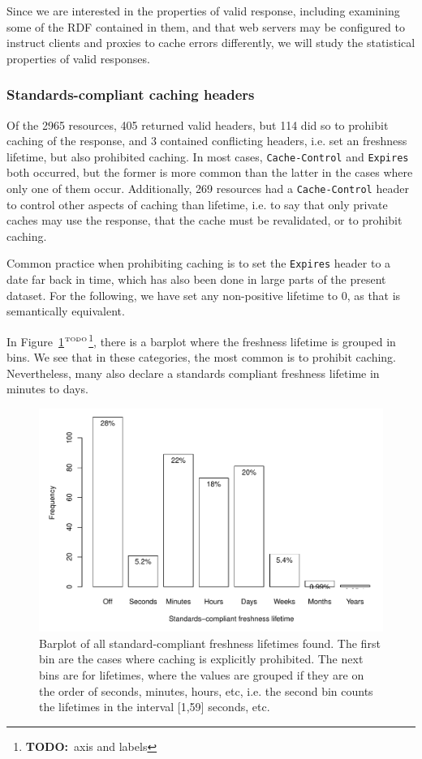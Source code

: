 \documentclass{llncs}
\newcommand{\httph}[1]{\texttt{#1}}
\newcommand{\todo}[1]{\ensuremath{^{\textrm{\tiny{TODO}\normalsize}}}\footnote{\textbf{TODO:}~#1}}
\begin{document}
Since we are interested in the properties of valid response, including
examining some of the RDF contained in them, and that web servers may
be configured to instruct clients and proxies to cache errors
differently, we will study the statistical properties of valid
responses.

\subsubsection{Standards-compliant caching headers}

Of the 2965 resources, 405 returned valid headers, but 114 did so to
prohibit caching of the response, and 3 contained conflicting
headers, i.e. set an freshness lifetime, but also prohibited
caching. In most cases, \httph{Cache-Control} and \httph{Expires} both
occurred, but the former is more common than the latter in the cases
where only one of them occur.  Additionally, 269 resources had a
\httph{Cache-Control} header to control other aspects of caching than
lifetime, i.e. to say that only private caches may use the response,
that the cache must be revalidated, or to prohibit caching.

Common practice when prohibiting caching is to set the \httph{Expires}
header to a date far back in time, which has also been done in large
parts of the present dataset. For the following, we have set any
non-positive lifetime to 0, as that is semantically equivalent.

In Figure~\ref{fig:hardall}\todo{axis and labels}, there is a barplot where
the freshness lifetime is grouped in bins. We see that in these
categories, the most common is to prohibit caching. Nevertheless, many
also declare a standards compliant freshness lifetime in minutes to
days.

\begin{figure}[ht]
  \centerline{%
    \includegraphics[width=.9\textwidth]{hardall.pdf}}
  \caption{Barplot of all standard-compliant freshness lifetimes
    found. The first bin are the cases where caching is explicitly
    prohibited. The next bins are for lifetimes, where the values are
    grouped if they are on the order of seconds, minutes, hours, etc,
    i.e. the second bin counts the lifetimes in the interval [1,59]
    seconds, etc.}
  \label{fig:hardall}
\end{figure}
\end{document}
